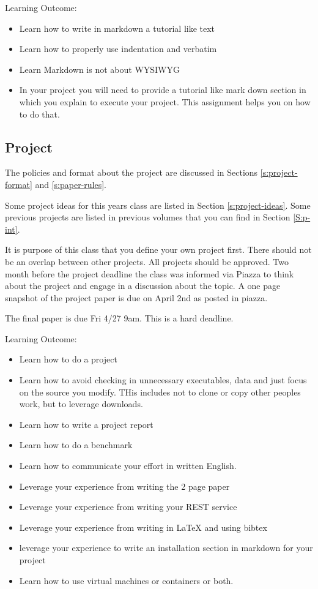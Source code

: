 Learning Outcome:
\begin{itemize}
\item Learn how to write in markdown a tutorial like text
\item Learn how to properly use indentation and verbatim 
\item Learn Markdown is not about WYSIWYG
\item In your project you will need to provide a tutorial like mark
  down section in which you explain to execute your project. This
  assignment helps you on how to do that.
\end{itemize}

\subsection{Project}
\label{E:project}

\begin{exercise} 

The policies and format about the project are discussed in Sections
\ref{s:project-format} and
\ref{s:paper-rules}.

Some project ideas for this years class are listed in Section
\ref{s:project-ideas}. Some previous projects are listed in previous
volumes that you can find in Section \ref{S:p-int}.

It is purpose of this class that you define your own project
first. There should not be an overlap between other projects. All
projects should be approved.  Two month before the project deadline
the class was informed via Piazza to think about the project and
engage in a discussion about the topic. A one page snapshot of the
project paper is due on April 2nd as posted in piazza.

The final paper is due Fri 4/27 9am. This is a hard deadline.

\end{exercise} 


Learning Outcome:
\begin{itemize}
\item Learn how to do a project
\item Learn how to avoid checking in unnecessary executables, data and
  just focus on the source you modify. THis includes not to clone or
  copy other peoples work, but to leverage downloads.
\item Learn how to write a project report
\item Learn how to do a benchmark
\item Learn how to communicate your effort in written English.
\item Leverage your experience from writing the 2 page paper
\item Leverage your experience from writing your REST service
\item Leverage your experience from writing in LaTeX and using bibtex
\item leverage your experience to write an installation section in
  markdown for your project
\item Learn how to use virtual machines or containers or both.
\end{itemize}

